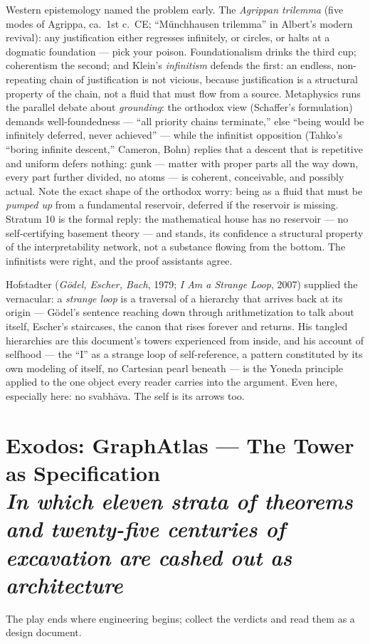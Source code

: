 \documentclass[11pt]{article}
\theoremstyle{plain}
\theoremstyle{definition}
\theoremstyle{remark}
\newcommand{\stratum}[2]{\section{#1 \\ {\normalsize\normalfont\itshape #2}}}
\begin{document}
Western epistemology named the problem early. The \emph{Agrippan trilemma} (five modes of Agrippa, ca.\ 1st c.\ CE; ``M\"unchhausen trilemma'' in Albert's modern revival): any justification either regresses infinitely, or circles, or halts at a dogmatic foundation --- pick your poison. Foundationalism drinks the third cup; coherentism the second; and Klein's \emph{infinitism} defends the first: an endless, non-repeating chain of justification is not vicious, because justification is a structural property of the chain, not a fluid that must flow from a source. Metaphysics runs the parallel debate about \emph{grounding}: the orthodox view (Schaffer's formulation) demands well-foundedness --- ``all priority chains terminate,'' else ``being would be infinitely deferred, never achieved'' --- while the infinitist opposition (Tahko's ``boring infinite descent,'' Cameron, Bohn) replies that a descent that is repetitive and uniform defers nothing: gunk --- matter with proper parts all the way down, every part further divided, no atoms --- is coherent, conceivable, and possibly actual. Note the exact shape of the orthodox worry: being as a fluid that must be \emph{pumped up} from a fundamental reservoir, deferred if the reservoir is missing. Stratum 10 is the formal reply: the mathematical house has no reservoir --- no self-certifying basement theory --- and stands, its confidence a structural property of the interpretability network, not a substance flowing from the bottom. The infinitists were right, and the proof assistants agree.

Hofstadter (\emph{G\"odel, Escher, Bach}, 1979; \emph{I Am a Strange Loop}, 2007) supplied the vernacular: a \emph{strange loop} is a traversal of a hierarchy that arrives back at its origin --- G\"odel's sentence reaching down through arithmetization to talk about itself, Escher's staircases, the canon that rises forever and returns. His tangled hierarchies are this document's towers experienced from inside, and his account of selfhood --- the ``I'' as a strange loop of self-reference, a pattern constituted by its own modeling of itself, no Cartesian pearl beneath --- is the Yoneda principle applied to the one object every reader carries into the argument. Even here, especially here: no svabh\=ava. The self is its arrows too.

\stratum{Exodos: GraphAtlas --- The Tower as Specification}{In which eleven strata of theorems and twenty-five centuries of excavation are cashed out as architecture}

The play ends where engineering begins; collect the verdicts and read them as a design document.
\end{document}
